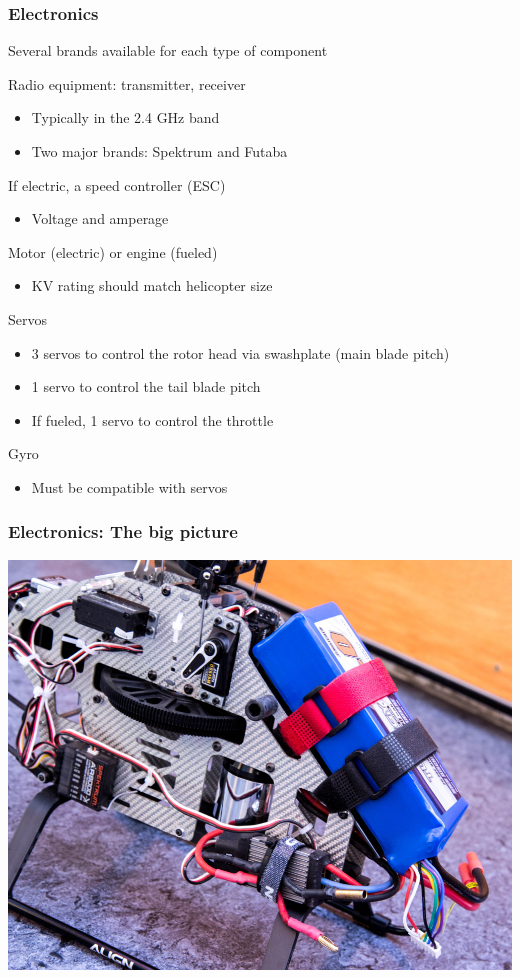 \documentclass{beamer}
\begin{document}
\begin{frame}
\frametitle{Electronics}

Several brands available for each type of component

Radio equipment: transmitter, receiver
\begin{itemize}
	\item Typically in the 2.4 GHz band
	\item Two major brands: Spektrum and Futaba
\end{itemize}

If electric, a speed controller (ESC)
\begin{itemize}
	\item Voltage and amperage
\end{itemize}

Motor (electric) or engine (fueled)
\begin{itemize}
	\item KV rating should match helicopter size
\end{itemize}

Servos
\begin{itemize}
	\item 3 servos to control the rotor head via swashplate (main blade pitch)
	\item 1 servo to control the tail blade pitch
	\item If fueled, 1 servo to control the throttle
\end{itemize}

Gyro
\begin{itemize}
	\item Must be compatible with servos
\end{itemize}

\end{frame}

\begin{frame}
\frametitle{Electronics: The big picture}

\begin{center}
	\includegraphics[width=.75\textwidth]{images/IMG_0637_cropped_smaller}
\end{center}
\end{frame}
\end{document}
